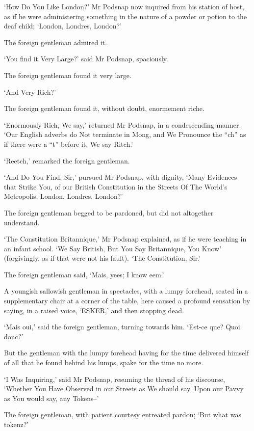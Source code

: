 ‘How Do You Like London?’ Mr Podsnap now inquired from his station of
host, as if he were administering something in the nature of a powder or
potion to the deaf child; ‘London, Londres, London?’

The foreign gentleman admired it.

‘You find it Very Large?’ said Mr Podsnap, spaciously.

The foreign gentleman found it very large.

‘And Very Rich?’

The foreign gentleman found it, without doubt, enormement riche.

‘Enormously Rich, We say,’ returned Mr Podsnap, in a condescending
manner. ‘Our English adverbs do Not terminate in Mong, and We Pronounce
the “ch” as if there were a “t” before it. We say Ritch.’

‘Reetch,’ remarked the foreign gentleman.

‘And Do You Find, Sir,’ pursued Mr Podsnap, with dignity, ‘Many
Evidences that Strike You, of our British Constitution in the Streets Of
The World’s Metropolis, London, Londres, London?’

The foreign gentleman begged to be pardoned, but did not altogether
understand.

‘The Constitution Britannique,’ Mr Podsnap explained, as if he were
teaching in an infant school. ‘We Say British, But You Say Britannique,
You Know’ (forgivingly, as if that were not his fault). ‘The
Constitution, Sir.’

The foreign gentleman said, ‘Mais, yees; I know eem.’

A youngish sallowish gentleman in spectacles, with a lumpy forehead,
seated in a supplementary chair at a corner of the table, here caused
a profound sensation by saying, in a raised voice, ‘ESKER,’ and then
stopping dead.

‘Mais oui,’ said the foreign gentleman, turning towards him. ‘Est-ce
que? Quoi donc?’

But the gentleman with the lumpy forehead having for the time delivered
himself of all that he found behind his lumps, spake for the time no
more.

‘I Was Inquiring,’ said Mr Podsnap, resuming the thread of his
discourse, ‘Whether You Have Observed in our Streets as We should say,
Upon our Pavvy as You would say, any Tokens--’

The foreign gentleman, with patient courtesy entreated pardon; ‘But what
was tokenz?’

